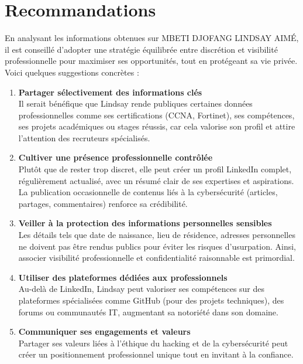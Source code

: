 \documentclass[12pt, a4paper]{article}
\begin{document}
	\newpage
	
	\section{\textbf{Recommandations}\label{recommandations}}
	
	En analysant les informations obtenues sur MBETI DJOFANG LINDSAY AIMÉ, il est conseillé d'adopter une stratégie équilibrée entre discrétion et visibilité professionnelle pour maximiser ses opportunités, tout en protégeant sa vie privée. Voici quelques suggestions concrètes :
	
	\begin{enumerate}[leftmargin=*]
		\item \textbf{Partager sélectivement des informations clés}\\
		Il serait bénéfique que Lindsay rende publiques certaines données professionnelles comme ses certifications (CCNA, Fortinet), ses compétences, ses projets académiques ou stages réussis, car cela valorise son profil et attire l'attention des recruteurs spécialisés.
		
		\item \textbf{Cultiver une présence professionnelle contrôlée}\\
		Plutôt que de rester trop discret, elle peut créer un profil LinkedIn complet, régulièrement actualisé, avec un résumé clair de ses expertises et aspirations. La publication occasionnelle de contenus liés à la cybersécurité (articles, partages, commentaires) renforce sa crédibilité.
		
		\item \textbf{Veiller à la protection des informations personnelles sensibles}\\
		Les détails tels que date de naissance, lieu de résidence, adresses personnelles ne doivent pas être rendus publics pour éviter les risques d'usurpation. Ainsi, associer visibilité professionnelle et confidentialité raisonnable est primordial.
		
		\item \textbf{Utiliser des plateformes dédiées aux professionnels}\\
		Au-delà de LinkedIn, Lindsay peut valoriser ses compétences sur des plateformes spécialisées comme GitHub (pour des projets techniques), des forums ou communautés IT, augmentant sa notoriété dans son domaine.
		
		\item \textbf{Communiquer ses engagements et valeurs}\\
		Partager ses valeurs liées à l'éthique du hacking et de la cybersécurité peut créer un positionnement professionnel unique tout en invitant à la confiance.
	\end{enumerate}
	
\end{document}
